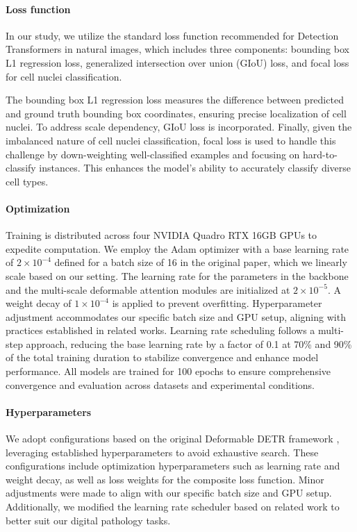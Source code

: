 \paragraph{Loss function}
In our study, we utilize the standard loss function recommended for Detection Transformers in natural images, which includes three components: bounding box L1 regression loss, generalized intersection over union (GIoU) loss, and focal loss for cell nuclei classification.

The bounding box L1 regression loss measures the difference between predicted and ground truth bounding box coordinates, ensuring precise localization of cell nuclei. To address scale dependency, GIoU loss is incorporated. Finally, given the imbalanced nature of cell nuclei classification, focal loss is used to handle this challenge by down-weighting well-classified examples and focusing on hard-to-classify instances. This enhances the model’s ability to accurately classify diverse cell types.

\paragraph{Optimization}
Training is distributed across four NVIDIA Quadro RTX 16GB GPUs to expedite computation. We employ the Adam optimizer with a base learning rate of $2 \times 10^{-4}$ defined for a batch size of 16 in the original paper, which we linearly scale based on our setting. The learning rate for the parameters in the backbone and the multi-scale deformable attention modules are initialized at $2 \times 10^{-5}$. A weight decay of $1 \times 10^{-4}$ is applied to prevent overfitting. Hyperparameter adjustment accommodates our specific batch size and GPU setup, aligning with practices established in related works. Learning rate scheduling follows a multi-step approach, reducing the base learning rate by a factor of 0.1 at 70\% and 90\% of the total training duration to stabilize convergence and enhance model performance. All models are trained for 100 epochs to ensure comprehensive convergence and evaluation across datasets and experimental conditions.

\paragraph{Hyperparameters}
We adopt configurations based on the original Deformable DETR framework \cite{zhu2020deformable}, leveraging established hyperparameters to avoid exhaustive search. These configurations include optimization hyperparameters such as learning rate and weight decay, as well as loss weights for the composite loss function. Minor adjustments were made to align with our specific batch size and GPU setup. Additionally, we modified the learning rate scheduler based on related work to better suit our digital pathology tasks.

